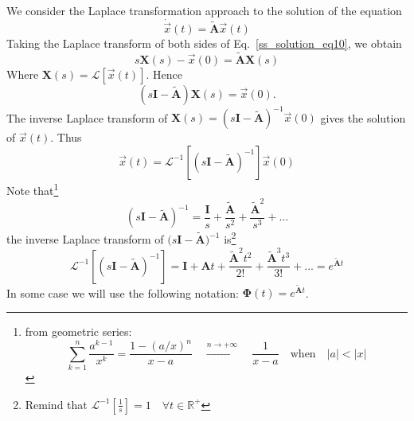 \documentclass[11pt,a4paper,oneside]{book}
\numberwithin{equation}{section}
\newcommand{\abs}[1]{\big|#1\big|}
\theoremstyle{it}
\theoremstyle{definition}
\begin{document}
We consider the Laplace transformation approach to the solution of the equation
\begin{equation}\label{ss_solution_eq10}
	\dot{\vec{x}}(t) = \tilde{\mathbf{A}} \vec{x}(t)
\end{equation}
Taking the Laplace transform of both sides of Eq.~\eqref{ss_solution_eq10}, we 
obtain
\begin{equation}
	s\mathbf{X}(s) - \vec{x}(0) = \tilde{\mathbf{A}} \mathbf{X}(s)
\end{equation}
Where $\mathbf{X}(s) = \mathcal{L}\left[ \vec{x}(t)\right]$. Hence
\begin{equation}
	\left( s\mathbf{I} - \tilde{\mathbf{A}}\right) \mathbf{X}(s)=\vec{x}(0).
\end{equation}
The inverse Laplace transform of $\mathbf{X}(s)= \left(s\mathbf{I}- 
\tilde{\mathbf{A}} \right)^{-1}\vec{x}(0)$ gives the solution of 
$\vec{x}(t)$. Thus 
\begin{equation}
	\vec{x}(t)= \mathcal{L}^{-1}\left[ \left(s\mathbf{I}-\tilde{\mathbf{A}} \right)^{-1} \right]\vec{x}(0) 
\end{equation}
Note that\footnote{from geometric series: $$ \sum_{k=1}^{n}\frac{a^{k-1}}{x^k} = \frac{1-(a/x)^n}{x-a}\quad\xrightarrow{n\rightarrow+\infty}\quad\frac{1}{x-a}\quad\text{when}\quad\abs{a}<\abs{x}$$}
\begin{equation}
	\left(s\mathbf{I}-\tilde{\mathbf{A}} \right)^{-1} = \frac{\mathbf{I}}{s}+\frac{\tilde{\mathbf{A}}}{s^2}+\frac{\tilde{\mathbf{A}}^2}{s^3}+...
\end{equation}
the inverse Laplace transform of $\big(s\mathbf{I}- \tilde{\mathbf{A}} 
\big)^{-1}$ is\footnote{Remind that 
$\mathcal{L}^{-1}\left[\frac{1}{s}\right]=1\quad\forall 
t\in\mathbb{R}^+$}
\begin{equation}
	\mathcal{L}^{-1}\left[ \left(s\mathbf{I}-\tilde{\mathbf{A}} \right)^{-1} \right] = \mathbf{I} + \mathbf{A}t+\frac{\tilde{\mathbf{A}}^2t^2}{2!}+\frac{\tilde{\mathbf{A}}^3t^3}{3!}+...=e^{\tilde{\mathbf{A}}t}
\end{equation}
In some case we will use the following notation: $\mathbf{\Phi}(t) = 
e^{\tilde{\mathbf{A}}t}$. 
\end{document}
